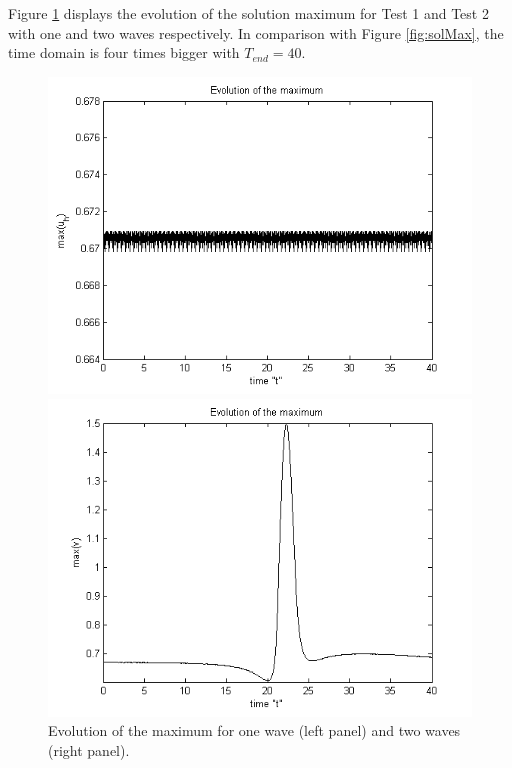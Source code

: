 \documentclass[11pt,a4paper,twoside]{article}
\begin{document}
Figure \ref{fig:solMax40} displays the evolution of the solution maximum for Test 1 and Test 2 with one and two waves respectively. In comparison with Figure \ref{fig:solMax}, the time domain is four times bigger with $T_{end}=40$. 
\begin{figure}[!htbp]
	\centering
	\begin{minipage}[b]{0.4\linewidth}
		\includegraphics[width=\linewidth]{Pictures/EvolutionOfMaximum.png}
	\end{minipage}	
	\begin{minipage}[b]{0.4\linewidth}
		 \includegraphics[width=\linewidth]{Pictures/EvolutionOfMaximumTwoWaves.png}
	\end{minipage}

	\caption{Evolution of the maximum for one wave (left panel) and two waves (right panel).}
	\label{fig:solMax40}
\end{figure}
\fi
\end{document}
